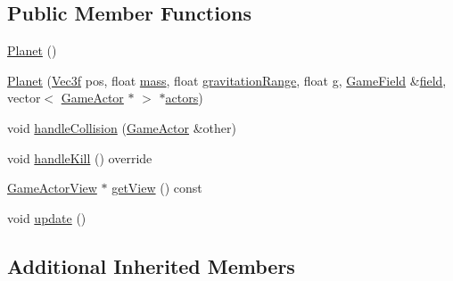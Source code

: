 \subsection*{Public Member Functions}
\begin{DoxyCompactItemize}
\item 
\hyperlink{class_planet_ac88200b337a62e1377858e3116f9412b}{Planet} ()
\item 
\hyperlink{class_planet_a87570708b07580b08d884b6a9731503f}{Planet} (\hyperlink{class_vec3f}{Vec3f} pos, float \hyperlink{class_game_actor_a2111233f4f0216db4d172d5088ebeed4}{mass}, float \hyperlink{class_game_actor_a9c0ba51b08a3e617d9629c0ee8d309f2}{gravitation\+Range}, float \hyperlink{class_game_actor_a42ed4bef0d99cf053ff9a025c86d34d3}{g}, \hyperlink{class_game_field}{Game\+Field} \&\hyperlink{class_game_actor_a0224fbc502abd6b7579787aa234332d5}{field}, vector$<$ \hyperlink{class_game_actor}{Game\+Actor} $\ast$ $>$ $\ast$\hyperlink{class_game_actor_a2405618d895f5143b42ae9e94d20e693}{actors})
\item 
void \hyperlink{class_planet_a9dd66b259905d35fa4233bd469662627}{handle\+Collision} (\hyperlink{class_game_actor}{Game\+Actor} \&other)
\item 
void \hyperlink{class_planet_aa2932c76f46038b77b427c08167018cc}{handle\+Kill} () override
\item 
\hyperlink{class_game_actor_view}{Game\+Actor\+View} $\ast$ \hyperlink{class_planet_a60f36a3e87d89c4467e3ee2854906a09}{get\+View} () const 
\item 
void \hyperlink{class_planet_a56f440c725e00a3b27e4fbd8da87813d}{update} ()
\end{DoxyCompactItemize}
\subsection*{Additional Inherited Members}


